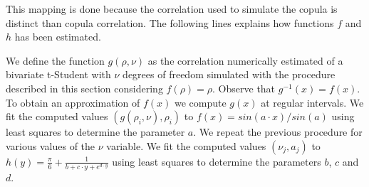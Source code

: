 \documentclass[a4paper,12pt,final]{article}
\begin{document}
This mapping is done because the correlation used to simulate the copula 
is distinct than copula correlation. The following lines explains how functions 
$f$ and $h$ has been estimated.
\newline

We define the function $g(\rho, \nu)$ as the correlation numerically estimated of 
a bivariate t-Student with $\nu$ degrees of freedom simulated with the procedure 
described in this section considering $f(\rho)=\rho$. Observe that $g^{-1}(x) = f(x)$.
To obtain an approximation of $f(x)$ we compute $g(x)$ at regular intervals. We fit 
the computed values $(g(\rho_i,\nu), \rho_i)$ to $f(x)=sin(a \cdot x)/sin(a)$ using 
least squares to determine the parameter $a$. We repeat the previous procedure for 
various values of the $\nu$ variable. We fit the computed values $(\nu_j, a_j)$ to 
$h(y) = \frac{\pi}{6} + \frac{1}{b + c \cdot y + e^{d \cdot y} }$ using least squares
to determine the parameters $b$, $c$ and $d$.

\end{document}
